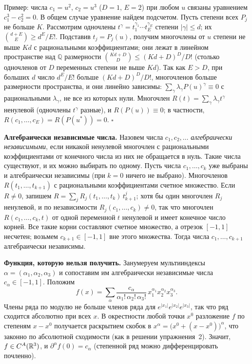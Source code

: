 \begin{solution}[6 (\S\,5)]
Пример: числа $c_1=u^2$, $c_2=u^3$ ($D=1$, $E=2$) при любом $u$ связаны
уравнением $c_1^3-c_2^2=0$. В общем случае уравнение найдем подсчетом. Пусть
степени всех $P_j$ не больше $K$. Рассмотрим одночлены $t^\gamma=t_1^{\gamma_1}\cdots
t_E^{\gamma_E}$ степени $|\gamma|\le d$; их $\binom{d+E}E\ge d^E/E!$. Подставив
$t_j=P_j(u)$, получим многочлены от $u$ степени не выше $Kd$ с рациональными
коэффициентами; они лежат в линейном пространстве над $\mathbb Q$ размерности
$\binom{Kd+D}D\le(Kd+D)^D/D!$ (столько одночленов от $D$ переменных степени не
выше $Kd$). Так как $E>D$, при больших $d$ число $d^E/E!$ больше
$(Kd+D)^D/D!$, многочленов больше размерности пространства, и они линейно
зависимы: $\sum_\gamma\lambda_\gamma P(u)^\gamma\equiv0$ с рациональными
$\lambda_\gamma$, не все из которых нули. Многочлен
$R(t)=\sum_\gamma\lambda_\gamma t^\gamma$ ненулевой (одночлены $t^\gamma$
разные), и $R(P(u))\equiv0$; в частности, $R(c_1,\dots,c_E)=R(P(u^*))=0$.
$\square$

\textbf{Алгебраически независимые числа.} Назовем числа $c_1,c_2,\dots$
\emph{алгебраически независимыми}, если никакой ненулевой многочлен
с рациональными коэффициентами от конечного числа из них не обращается
в нуль. Такие числа существуют, и их можно выбирать по одному. Пусть числа
$c_1,\dots,c_k$ уже выбраны и алгебраически независимы (при $k=0$ ничего не
выбрано). Многочленов $R(t_1,\dots,t_{k+1})$ с рациональными коэффициентами
счетное множество. Если $R\ne0$, запишем $R=\sum_jR_j(t_1,\dots,t_k)\,t_{k+1}^j$;
хотя бы один многочлен $R_j$ ненулевой, и по независимости
$R_j(c_1,\dots,c_k)\ne0$, так что многочлен $R(c_1,\dots,c_k,t)$ от одной
переменной $t$ ненулевой и имеет конечное число корней. Все такие корни
составляют счетное множество, а отрезок $[-1,1]$ несчетен; возьмем
$c_{k+1}\in[-1,1]$ вне этого множества. Тогда числа $c_1,\dots,c_{k+1}$
алгебраически независимы.

\textbf{Функция, которую нельзя получить.} Занумеруем мультииндексы
$\alpha=(\alpha_1,\alpha_2,\alpha_3)$ и сопоставим им алгебраически
независимые числа $c_\alpha\in[-1,1]$. Положим
\[
f(x)=\sum_\alpha\frac{c_\alpha}{\alpha_1!\,\alpha_2!\,\alpha_3!}\,x_1^{\alpha_1}x_2^{\alpha_2}x_3^{\alpha_3}.
\]
Члены ряда по модулю не больше членов ряда для $e^{|x_1|}e^{|x_2|}e^{|x_3|}$,
так что ряд сходится абсолютно при всех $x$. В окрестности любой точки $x^0$
разложение $f$ по степеням $x-x^0$ получается раскрытием скобок в
$x^\alpha=\bigl(x^0+(x-x^0)\bigr)^\alpha$, что законно по абсолютной сходимости
(как в решении упражнения~2). Значит, $f\in C^A(\mathbb R^3)$, и
$\partial^\alpha f(0)=c_\alpha$ (степенной ряд можно дифференцировать
почленно).


\end{solution}
